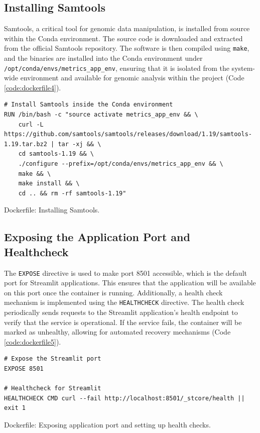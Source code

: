 \subsection{Installing Samtools}

Samtools, a critical tool for genomic data manipulation, is installed from source within the Conda environment. The source code is downloaded and extracted from the official Samtools repository. The software is then compiled using \texttt{make}, and the binaries are installed into the Conda environment under \texttt{/opt/conda/envs/metrics\_app\_env}, ensuring that it is isolated from the system-wide environment and available for genomic analysis within the project (Code \ref{code:dockerfile4}).

\begin{longlisting}
\begin{verbatim}
# Install Samtools inside the Conda environment
RUN /bin/bash -c "source activate metrics_app_env && \
    curl -L https://github.com/samtools/samtools/releases/download/1.19/samtools-1.19.tar.bz2 | tar -xj && \
    cd samtools-1.19 && \
    ./configure --prefix=/opt/conda/envs/metrics_app_env && \
    make && \
    make install && \
    cd .. && rm -rf samtools-1.19"
\end{verbatim}
\caption{Dockerfile: Installing Samtools.}
\label{code:dockerfile4}
\end{longlisting}

\subsection{Exposing the Application Port and Healthcheck}

The \texttt{EXPOSE} directive is used to make port 8501 accessible, which is the default port for Streamlit applications. This ensures that the application will be available on this port once the container is running. Additionally, a health check mechanism is implemented using the \texttt{HEALTHCHECK} directive. The health check periodically sends requests to the Streamlit application's health endpoint to verify that the service is operational. If the service fails, the container will be marked as unhealthy, allowing for automated recovery mechanisms (Code \ref{code:dockerfile5}).

\begin{longlisting}
\begin{verbatim}
# Expose the Streamlit port
EXPOSE 8501

# Healthcheck for Streamlit
HEALTHCHECK CMD curl --fail http://localhost:8501/_stcore/health || exit 1
\end{verbatim}
\caption{Dockerfile: Exposing application port and setting up health checks.}
\label{code:dockerfile5}
\end{longlisting}

